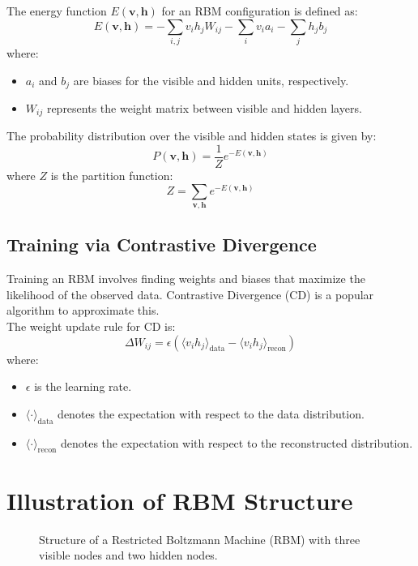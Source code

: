 \documentclass{article}
\begin{document}
The energy function \( E(\mathbf{v}, \mathbf{h}) \) for an RBM configuration is defined as:
\[
E(\mathbf{v}, \mathbf{h}) = -\sum_{i,j} v_i h_j W_{ij} - \sum_i v_i a_i - \sum_j h_j b_j
\]
where:
\begin{itemize}
    \item \( a_i \) and \( b_j \) are biases for the visible and hidden units, respectively.
    \item \( W_{ij} \) represents the weight matrix between visible and hidden layers.
\end{itemize}

The probability distribution over the visible and hidden states is given by:
\[
P(\mathbf{v}, \mathbf{h}) = \frac{1}{Z} e^{-E(\mathbf{v}, \mathbf{h})}
\]
where \( Z \) is the partition function: \\
\[
Z = \sum_{\mathbf{v}, \mathbf{h}} e^{-E(\mathbf{v}, \mathbf{h})}
\]
\subsection{Training via Contrastive Divergence}
Training an RBM involves finding weights and biases that maximize the likelihood of the observed data. Contrastive Divergence (CD) is a popular algorithm to approximate this.\\

The weight update rule for CD is:\\
\[
\Delta W_{ij} = \epsilon (\langle v_i h_j \rangle_{\text{data}} - \langle v_i h_j \rangle_{\text{recon}})
\]
where:\\
\begin{itemize}
    \item \( \epsilon \) is the learning rate.
    \item \( \langle \cdot \rangle_{\text{data}} \) denotes the expectation with respect to the data distribution.
    \item \( \langle \cdot \rangle_{\text{recon}} \) denotes the expectation with respect to the reconstructed distribution.
\end{itemize}

\section{Illustration of RBM Structure}
\begin{figure}[h!]
    \centering
    \caption{Structure of a Restricted Boltzmann Machine (RBM) with three visible nodes and two hidden nodes.}
    \label{fig:rbm_structure}
\end{figure}
\end{document}
